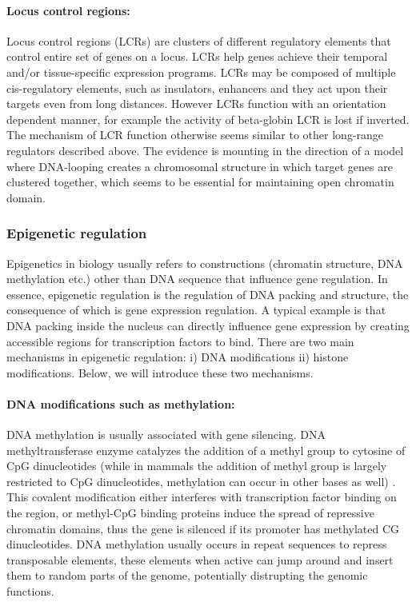 \documentclass[12pt,]{krantz}
\let\oldparagraph\paragraph
\renewcommand{\paragraph}[1]{\oldparagraph{#1}\mbox{}}
\theoremstyle{definition}
\theoremstyle{definition}
\theoremstyle{definition}
\theoremstyle{remark}
\begin{document}
\hypertarget{locus-control-regions}{%
\paragraph{Locus control regions:}\label{locus-control-regions}}

Locus control regions (LCRs) are clusters of different regulatory
elements that control entire set of genes on a locus. LCRs help genes
achieve their temporal and/or tissue-specific expression programs. LCRs
may be composed of multiple cis-regulatory elements, such as insulators,
enhancers and they act upon their targets even from long distances.
However LCRs function with an orientation dependent manner, for example
the activity of beta-globin LCR is lost if inverted. The mechanism of
LCR function otherwise seems similar to other long-range regulators
described above. The evidence is mounting in the direction of a model
where DNA-looping creates a chromosomal structure in which target genes
are clustered together, which seems to be essential for maintaining open
chromatin domain.

\hypertarget{epigenetic-regulation}{%
\subsubsection{Epigenetic regulation}\label{epigenetic-regulation}}

Epigenetics in biology usually refers to constructions (chromatin
structure, DNA methylation etc.) other than DNA sequence that influence
gene regulation. In essence, epigenetic regulation is the regulation of
DNA packing and structure, the consequence of which is gene expression
regulation. A typical example is that DNA packing inside the nucleus can
directly influence gene expression by creating accessible regions for
transcription factors to bind. There are two main mechanisms in
epigenetic regulation: i) DNA modifications ii) histone modifications.
Below, we will introduce these two mechanisms.

\hypertarget{dna-modifications-such-as-methylation}{%
\paragraph{DNA modifications such as
methylation:}\label{dna-modifications-such-as-methylation}}

DNA methylation is usually associated with gene silencing. DNA
methyltransferase enzyme catalyzes the addition of a methyl group to
cytosine of CpG dinucleotides (while in mammals the addition of methyl
group is largely restricted to CpG dinucleotides, methylation can occur
in other bases as well) . This covalent modification either interferes
with transcription factor binding on the region, or methyl-CpG binding
proteins induce the spread of repressive chromatin domains, thus the
gene is silenced if its promoter has methylated CG dinucleotides. DNA
methylation usually occurs in repeat sequences to repress transposable
elements, these elements when active can jump around and insert them to
random parts of the genome, potentially distrupting the genomic
functions.
\end{document}
